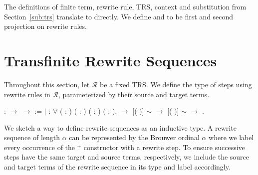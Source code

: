 The definitions of finite term, rewrite rule, TRS, context and substitution
from Section~\ref{sub:trs} translate to \Coq directly. We define
 and  to be first and second
projection on rewrite rules.


\section{Transfinite Rewrite Sequences}\label{sec:seq}

Throughout this section, let $\mathcal{R}$ be a fixed TRS. We define the type
of steps using rewrite rules in $\mathcal{R}$, parameterized by their source
and target terms.
\begin{singlespace}
\begin{coqdoccode}
\coqdocnoindent
{}  :
 \ensuremath{\rightarrow}
 \ensuremath{\rightarrow}
 :=\coqdoceol
\coqdocindent{1.00em}
\ensuremath{|}  :
\ensuremath{\forall} (  :
) (\coqdocvar{$\rho$} :
) ( :
) (\coqdocvar{$\sigma$} :
),\coqdoceol
\coqdocindent{6.50em} \coqdocvariable{$\rho$}
 \ensuremath{\rightarrow}\coqdoceol
\coqdocindent{6.50em}
[(
\coqdocvariable{$\rho$})\coqdocvariable{$^\sigma$}] $\sim$ 
\ensuremath{\rightarrow}\coqdoceol
\coqdocindent{6.50em}
[(
\coqdocvariable{$\rho$})\coqdocvariable{$^\sigma$}] $\sim$ 
\ensuremath{\rightarrow}\coqdoceol
\coqdocindent{6.50em}
 
.\coqdoceol
\end{coqdoccode}
\end{singlespace}
We sketch a way to define rewrite sequences as an inductive type. A rewrite
sequence of length $\alpha$ can be represented by the Brouwer ordinal $\alpha$
where we label every occurrence of the $^+$ constructor with a rewrite
step. To ensure successive steps have the same target and source terms,
respectively, we include the source and target terms of the rewrite sequence
in its type and label accordingly.

